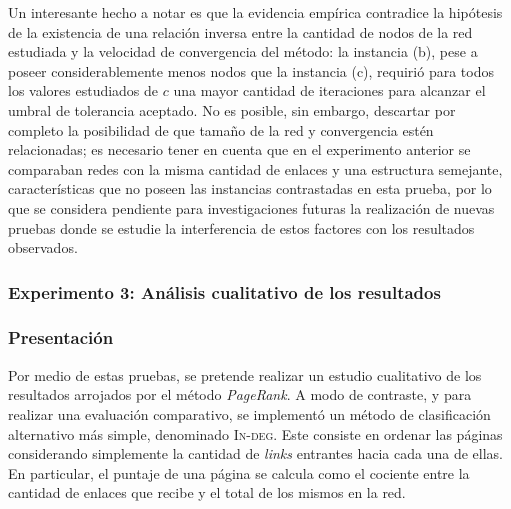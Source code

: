             Un interesante hecho a notar es que la evidencia empírica contradice la hipótesis de la existencia de una relación inversa entre la cantidad de nodos de la red estudiada y la velocidad de convergencia del método: la instancia (b), pese a poseer considerablemente menos nodos que la instancia (c), requirió para todos los valores estudiados de $c$ una mayor cantidad de iteraciones para alcanzar el umbral de tolerancia aceptado. No es posible, sin embargo, descartar por completo la posibilidad de que tamaño de la red y convergencia estén relacionadas; es necesario tener en cuenta que en el experimento anterior se comparaban redes con la misma cantidad de enlaces y una estructura semejante, características que no poseen las instancias contrastadas en esta prueba, por lo que se considera pendiente para investigaciones futuras la realización de nuevas pruebas donde se estudie la interferencia de estos factores con los resultados observados.

        \subsubsection{Experimento 3: Análisis cualitativo de los resultados}

            \subsubsection*{Presentación}
            Por medio de estas pruebas, se pretende realizar un estudio cualitativo de los resultados arrojados por el método \emph{PageRank}. A modo de contraste, y para realizar una evaluación comparativo, se implementó un método de clasificación alternativo más simple, denominado \textsc{In-deg}. Este consiste en ordenar las páginas considerando simplemente la cantidad de \emph{links} entrantes hacia cada una de ellas. En particular, el puntaje de una página se calcula como el cociente entre la cantidad de enlaces que recibe y el total de los mismos en la red.

